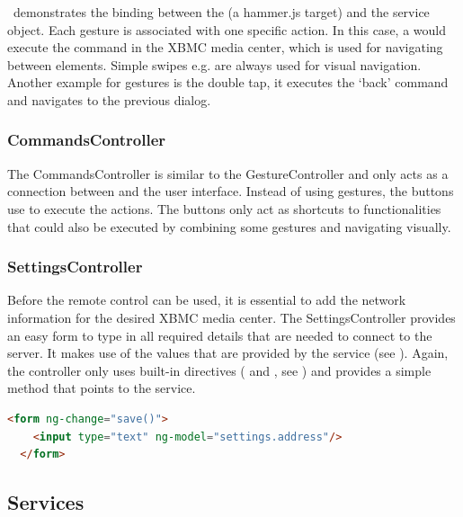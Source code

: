  \ demonstrates the binding between the  (a hammer.js target) and the  service object. Each gesture is associated with one specific action. In this case, a  would execute the  command in the XBMC media center, which is used for navigating between elements. Simple swipes e.g. are always used for visual navigation. Another example for gestures is the double tap, it executes the `back' command and navigates to the previous dialog.

\subsubsection{CommandsController}

The CommandsController is similar to the GestureController and only acts as a connection between  and the user interface. Instead of using gestures, the buttons use  to execute the actions. The buttons only act as shortcuts to functionalities that could also be executed by combining some gestures and navigating visually.

\subsubsection{SettingsController}

Before the remote control can be used, it is essential to add the network information for the desired XBMC media center. The SettingsController provides an easy form to type in all required details that are needed to connect to the server. It makes use of the values that are provided by the  service (see ). Again, the controller only uses built-in directives ( and , see ) and provides a simple  method that points to the  service.

\begin{lstlisting}[language=HTML, caption=SettingsController bindings, label=lst:settings-controller]
  <form ng-change="save()">
    <input type="text" ng-model="settings.address"/>
  </form>
\end{lstlisting}

\subsection{Services}

